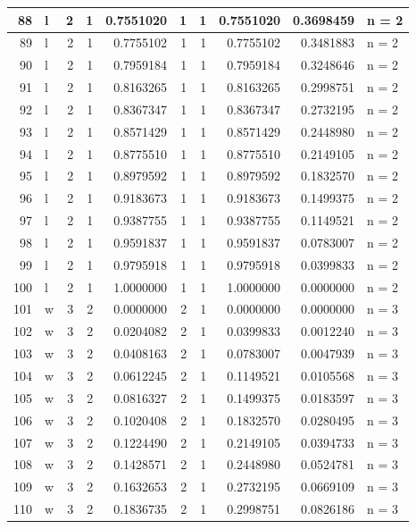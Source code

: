 \documentclass[
  letterpaper,
  DIV=11,
  numbers=noendperiod]{scrreprt}
\begin{document}
\begin{table}
\begin{tabular}[t]{r|l|r|r|r|r|r|r|r|l}
\hline
88 & l & 2 & 1 & 0.7551020 & 1 & 1 & 0.7551020 & 0.3698459 & n = 2\\
\hline
89 & l & 2 & 1 & 0.7755102 & 1 & 1 & 0.7755102 & 0.3481883 & n = 2\\
\hline
90 & l & 2 & 1 & 0.7959184 & 1 & 1 & 0.7959184 & 0.3248646 & n = 2\\
\hline
91 & l & 2 & 1 & 0.8163265 & 1 & 1 & 0.8163265 & 0.2998751 & n = 2\\
\hline
92 & l & 2 & 1 & 0.8367347 & 1 & 1 & 0.8367347 & 0.2732195 & n = 2\\
\hline
93 & l & 2 & 1 & 0.8571429 & 1 & 1 & 0.8571429 & 0.2448980 & n = 2\\
\hline
94 & l & 2 & 1 & 0.8775510 & 1 & 1 & 0.8775510 & 0.2149105 & n = 2\\
\hline
95 & l & 2 & 1 & 0.8979592 & 1 & 1 & 0.8979592 & 0.1832570 & n = 2\\
\hline
96 & l & 2 & 1 & 0.9183673 & 1 & 1 & 0.9183673 & 0.1499375 & n = 2\\
\hline
97 & l & 2 & 1 & 0.9387755 & 1 & 1 & 0.9387755 & 0.1149521 & n = 2\\
\hline
98 & l & 2 & 1 & 0.9591837 & 1 & 1 & 0.9591837 & 0.0783007 & n = 2\\
\hline
99 & l & 2 & 1 & 0.9795918 & 1 & 1 & 0.9795918 & 0.0399833 & n = 2\\
\hline
100 & l & 2 & 1 & 1.0000000 & 1 & 1 & 1.0000000 & 0.0000000 & n = 2\\
\hline
101 & w & 3 & 2 & 0.0000000 & 2 & 1 & 0.0000000 & 0.0000000 & n = 3\\
\hline
102 & w & 3 & 2 & 0.0204082 & 2 & 1 & 0.0399833 & 0.0012240 & n = 3\\
\hline
103 & w & 3 & 2 & 0.0408163 & 2 & 1 & 0.0783007 & 0.0047939 & n = 3\\
\hline
104 & w & 3 & 2 & 0.0612245 & 2 & 1 & 0.1149521 & 0.0105568 & n = 3\\
\hline
105 & w & 3 & 2 & 0.0816327 & 2 & 1 & 0.1499375 & 0.0183597 & n = 3\\
\hline
106 & w & 3 & 2 & 0.1020408 & 2 & 1 & 0.1832570 & 0.0280495 & n = 3\\
\hline
107 & w & 3 & 2 & 0.1224490 & 2 & 1 & 0.2149105 & 0.0394733 & n = 3\\
\hline
108 & w & 3 & 2 & 0.1428571 & 2 & 1 & 0.2448980 & 0.0524781 & n = 3\\
\hline
109 & w & 3 & 2 & 0.1632653 & 2 & 1 & 0.2732195 & 0.0669109 & n = 3\\
\hline
110 & w & 3 & 2 & 0.1836735 & 2 & 1 & 0.2998751 & 0.0826186 & n = 3\\

\end{tabular}
\end{table}
\end{document}

